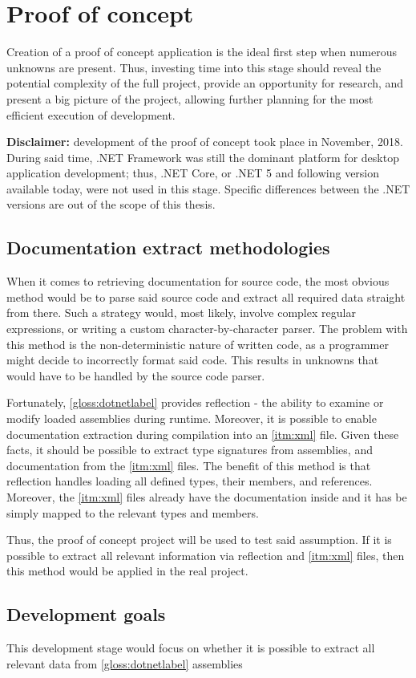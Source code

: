 \chapter{Proof of concept}

Creation of a proof of concept application is the ideal first step when numerous unknowns are present. Thus, investing time into this stage should reveal the potential complexity of the full project, provide an opportunity for research, and present a big picture of the project, allowing further planning for the most efficient execution of development.

\textbf{Disclaimer:}
development of the proof of concept took place in November, 2018. During said time, .NET Framework was still the dominant platform for desktop application development; thus, .NET Core, or .NET 5 and following version available today, were not used in this stage. Specific differences between the .NET versions are out of the scope of this thesis.

\section{Documentation extract methodologies}
When it comes to retrieving documentation for source code, the most obvious method would be to parse said source code and extract all required data straight from there. Such a strategy would, most likely, involve complex regular expressions, or writing a custom character-by-character parser. The problem with this method is the non-deterministic nature of written code, as a programmer might decide to incorrectly format said code. This results in unknowns that would have to be handled by the source code parser.

Fortunately, \ref{gloss:dotnetlabel} provides reflection - the ability to examine or modify loaded assemblies during runtime. Moreover, it is possible to enable documentation extraction during compilation into an \ref{itm:xml} file. Given these facts, it should be possible to extract type signatures from assemblies, and documentation from the \ref{itm:xml} files. The benefit of this method is that reflection handles loading all defined types, their members, and references. Moreover, the \ref{itm:xml} files already have the documentation inside and it has be simply mapped to the relevant types and members.

Thus, the proof of concept project will be used to test said assumption. If it is possible to extract all relevant information via reflection and \ref{itm:xml} files, then this method would be applied in the real project.

\section{Development goals}
This development stage would focus on whether it is possible to extract all relevant data from \ref{gloss:dotnetlabel} assemblies